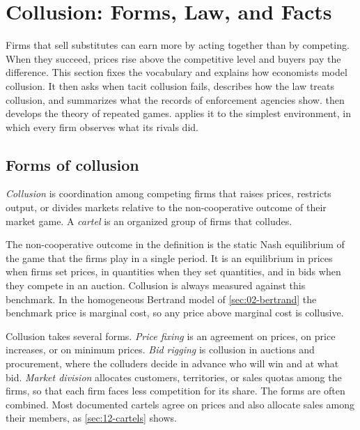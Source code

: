 \section{Collusion: Forms, Law, and Facts}\label{sec:12-facts}

Firms that sell substitutes can earn more by acting together than by competing. When they succeed, prices rise
above the competitive level and buyers pay the difference. This section fixes the vocabulary and explains how
economists model collusion. It then asks when tacit collusion fails, describes how the law treats collusion, and
summarizes what the records of enforcement agencies show.  then
develops the theory of repeated games.  applies it to the simplest environment, in which every
firm observes what its rivals did.

\subsection{Forms of collusion}\label{sec:12-forms}

\begin{definition}[Collusion]\label{def:12-collusion}
\emph{Collusion} is coordination among competing firms that raises prices, restricts output, or divides markets
relative to the non-cooperative outcome of their market game. A \emph{cartel} is an organized group of firms that
colludes.
\end{definition}

The non-cooperative outcome in the definition is the static Nash equilibrium of the game that the firms play in a
single period. It is an equilibrium in prices when firms set prices, in quantities when they set quantities, and in
bids when they compete in an auction. Collusion is always measured against this benchmark. In the homogeneous
Bertrand model of \cref{sec:02-bertrand} the benchmark price is marginal cost, so any price above marginal cost is
collusive.

Collusion takes several forms. \emph{Price fixing} is an agreement on prices, on price increases, or on minimum
prices. \emph{Bid rigging} is collusion in auctions and procurement, where the colluders decide in advance who will
win and at what bid. \emph{Market division} allocates customers, territories, or sales quotas among the firms, so
that each firm faces less competition for its share. The forms are often combined. Most documented cartels agree on
prices and also allocate sales among their members, as \cref{sec:12-cartels} shows.

